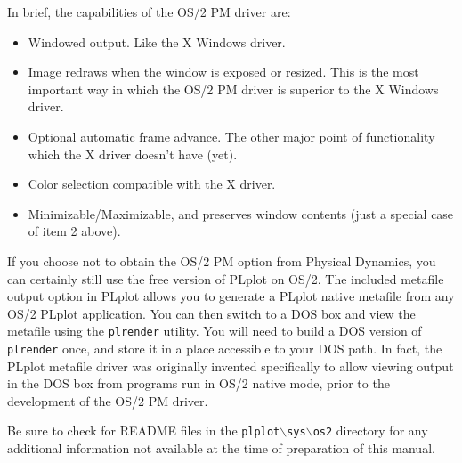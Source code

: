 In brief, the capabilities of the OS/2 PM driver are:
\begin{itemize}

\item	Windowed output.  Like the X Windows driver.

\item	Image redraws when the window is exposed or resized.  This is the most
	important way in which the OS/2 PM driver is superior to the
        X Windows driver.

\item	Optional automatic frame advance.  The other major point of 
	functionality which the X driver doesn't have  (yet).
        
\item	Color selection compatible with the X driver.

\item	Minimizable/Maximizable, and preserves window contents  (just a
	special case of item 2 above).

\end{itemize}

If you choose not to obtain the OS/2 PM option  from Physical Dynamics, you
can certainly still use the free version of PLplot on OS/2.  The included 
metafile output option in PLplot allows you to generate a PLplot native
metafile from any OS/2 PLplot application.  You can then switch to a DOS box
and view the metafile using the {\tt plrender} utility.  You will need to
build a DOS version of {\tt plrender} once, and store it in a place accessible 
to your DOS path.  In fact, the PLplot metafile driver was originally invented 
specifically to allow viewing output in the DOS box from programs run in
OS/2 native mode, prior to the development of the OS/2 PM driver.

Be sure to check for README files in the 
{\tt plplot$\backslash$sys$\backslash$os2} directory for any additional
information not available at the time of preparation of this manual.
